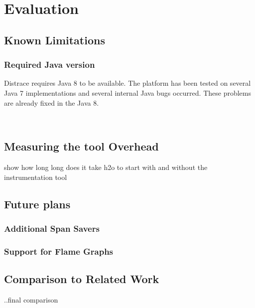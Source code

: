 \chapter{Evaluation}
\label{chap:evaluation}

\section{Known Limitations}
\subsection{Required Java version}
Distrace requires Java 8 to be available. The platform has been tested on several Java 7 implementations and several internal Java bugs occurred. These problems are already fixed in the Java 8.

\
\section{Measuring the tool Overhead}
show how long long does it take h2o to start with and without the instrumentation tool
\section{Future plans}
\subsection{Additional Span Savers}
\subsection{Support for Flame Graphs}

\section{Comparison to Related Work}
..final comparison

